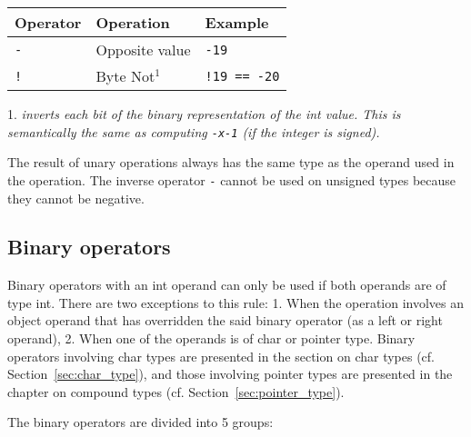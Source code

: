 \begin{center}
  \vspace{-5pt}
  \begin{threeparttable}
    \begin{tabular}{|l|ll|}
      \hline
      Operator & Operation & Example\\[0pt]
      \hline
      \hline
      \texttt{-} & Opposite value & \texttt{-19}\\[0pt]
      \hline
      \texttt{!} & Byte Not\(^{1}\) & \texttt{!19 == -20}\\[0pt]
      \hline
    \end{tabular}
    \begin{tablenotes}

    \item[1.] \footnotesize \textit{inverts each bit of the binary
      representation of the int value. This is semantically the same as
      computing \texttt{-x-1} (if the integer is signed).}

    \end{tablenotes}
  \end{threeparttable}
\end{center}

The result of unary operations always has the same type as the operand used in
the operation. The inverse operator \texttt{-} cannot be used on unsigned types
because they cannot be negative.

\subsection{Binary operators}
\label{sec:orgb91194f}

Binary operators with an int operand can only be used if both operands are of
type int. There are two exceptions to this rule: 1. When the operation involves
an object operand that has overridden the said binary operator (as a left or
right operand), 2. When one of the operands is of char or pointer type. Binary
operators involving char types are presented in the section on char types
(cf. Section~\ref{sec:char_type}), and those involving pointer types are presented in
the chapter on compound types (cf. Section~\ref{sec:pointer_type}).

The binary operators are divided into 5 groups:


